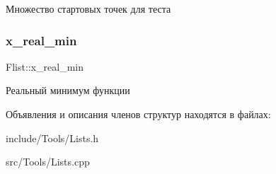 Множество стартовых точек для теста \mbox{\label{structFlist_a597f07bd67e9afba1666dcc0c61dc33f}} 
\subsubsection{\texorpdfstring{x\+\_\+real\+\_\+min}{x\_real\_min}}
{\footnotesize\ttfamily Flist\+::x\+\_\+real\+\_\+min}

Реальный минимум функции 

Объявления и описания членов структур находятся в файлах\+:\begin{DoxyCompactItemize}
\item 
include/\+Tools/Lists.\+h\item 
src/\+Tools/Lists.\+cpp\end{DoxyCompactItemize}
